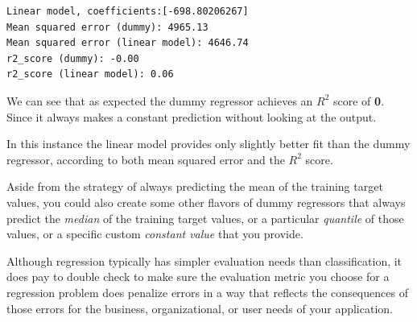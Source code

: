 \begin{multicols}{2}
\begin{verbatim}
Linear model, coefficients:[-698.80206267]
Mean squared error (dummy): 4965.13
Mean squared error (linear model): 4646.74
r2_score (dummy): -0.00
r2_score (linear model): 0.06
\end{verbatim}

We can see that as expected the dummy regressor achieves an $R^2$ score of \textbf{0}. Since it always makes a constant prediction without looking at the output. 

In this instance the linear model provides only slightly better fit than the dummy regressor, according to both mean squared error and the $R^2$ score. 

Aside from the strategy of always predicting the mean of the training target values, you could also create some other flavors of dummy regressors that always predict the \emph{median} of the training target values, or a particular \emph{quantile} of those values, or a specific custom \emph{constant value} that you provide. 

Although regression typically has simpler evaluation needs than classification, it does pay to double check to make sure the evaluation metric you choose for a regression problem does penalize errors in a way that reflects the consequences of those errors for the business, organizational, or user needs of your application. 

\end{multicols}